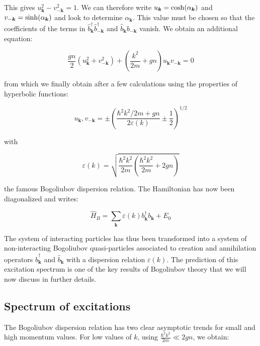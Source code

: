 This gives $u_{\bm{k}}^2 -  v_{-\bm{k}}^2 =1$. We can therefore write $u_{\bm{k}}={\rm cosh}(\alpha_{\bm{k}})$ and $v_{-\bm{k}}={\rm sinh}(\alpha_{\bm{k}})$ and look to determine $\alpha_{\bm{k}}$. This value must be chosen so that the coefficients of the terms in $\hat{b}^{\dagger}_{\bm{k}} \hat{b}^{\dagger}_{-\bm{k}}$ and $\hat{b}_{\bm{k}} \hat{b}_{-\bm{k}}$ vanish. We obtain an additional equation:

\begin{equation}
    \frac{g n}{2}\left(u_{\bm{k}}^{2}+v_{-\bm{k}}^{2}\right)+\left(\frac{k^{2}}{2 m}+g n\right) u_{\bm{k}} v_{-\bm{k}}=0
\end{equation}

from which we finally obtain after a few calculations using the properties of hyperbolic functions:

\begin{equation}
    u_{\bm{k}}, v_{-\bm{k}}=\pm\left(\frac{\hbar^2k^{2} / 2 m+g n}{2 \varepsilon(k)} \pm \frac{1}{2}\right)^{1 / 2}
\end{equation}

with 

\begin{equation}
    \varepsilon(k)=\sqrt{\frac{\hbar^2 k^2}{2m}(\frac{\hbar^2 k^2}{2m}+2gn)}
\end{equation}

the famous Bogoliubov dispersion relation. The Hamiltonian has now been diagonalized and writes:

\begin{equation}
    \hat{H}_B = \sum_{\bm{k}}\varepsilon(k) b^{\dagger}_{\bm{k}}  b_{\bm{k}}+E_0
\end{equation}

The system of interacting particles has thus been transformed into a system of non-interacting Bogoliubov quasi-particles associated to creation and annihilation operators $\hat{b}^{\dagger}_{\bm{k}}$ and $\hat{b}_{\bm{k}}$ with a dispersion relation $\varepsilon(k)$. The prediction of this excitation spectrum is one of the key results of Bogoliubov theory that we will now discuss in further details.

\subsection{Spectrum of excitations}
\label{sec:spectrum}

The Bogoliubov dispersion relation has two clear asymptotic trends for small and high momentum values. For low values of $k$, using $\frac{\hbar^2 k^2}{2m} \ll 2gn$, we obtain:

